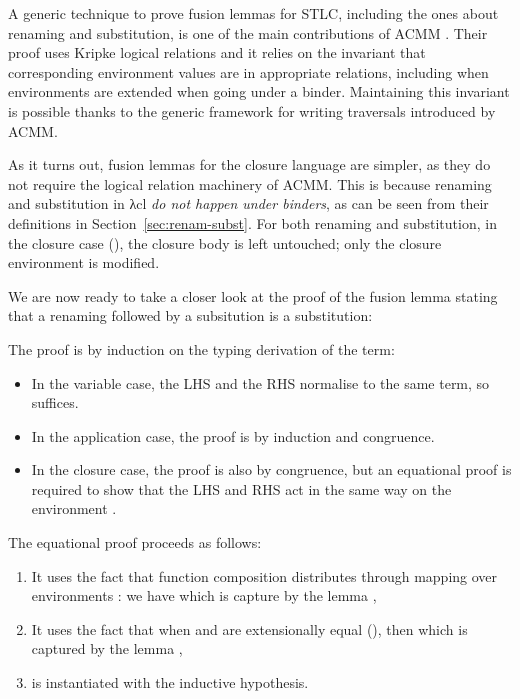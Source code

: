 \documentclass[bsc,frontabs,oneside,singlespacing,parskip,deptreport]{infthesis}
\theoremstyle{definition}
\theoremstyle{lemma}
\begin{document}
A generic technique to prove fusion lemmas for STLC, including the
ones about renaming and substitution, is one of the main contributions
of ACMM \cite{DBLP:conf/cpp/Allais0MM17}. Their proof uses Kripke
logical relations and it relies on the invariant that corresponding
environment values are in appropriate relations, including when
environments are extended when going under a binder. Maintaining this
invariant is possible thanks to the generic framework for writing
traversals introduced by ACMM.

As it turns out, fusion lemmas for the closure language are simpler,
as they do not require the logical relation machinery of ACMM. This is
because renaming and substitution in λcl \textit{do not happen under
  binders}, as can be seen from their definitions in
Section~\ref{sec:renam-subst}. For both renaming and substitution, in
the closure case (), the closure body is left untouched; only
the closure environment is modified.

We are now ready to take a closer look at the proof of the fusion
lemma stating that a renaming followed by a subsitution is a
substitution:


The proof is by induction on the typing derivation of the term:

\begin{itemize}
\item In the variable case, the LHS and the RHS normalise to the same
  term, so  suffices.
\item In the application case, the proof is by induction and
  congruence.
\item In the closure case, the proof is also by congruence, but an
  equational proof is required to show that the LHS and RHS act in the
  same way on the environment .
\end{itemize}

The equational proof proceeds as follows:

\begin{enumerate}[nolistsep]
\item It uses the fact that function composition 
  distributes through mapping over environments \AS{\_<\$>\_}: we have
   which is capture by the lemma
  ,
\item It uses the fact that when  and  are extensionally
  equal (), then  which
  is captured by the lemma ,
\item {} is instantiated with the inductive hypothesis.
\end{enumerate}
\end{document}
